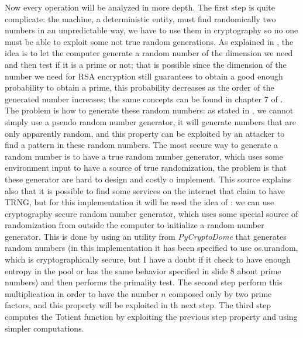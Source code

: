 \documentclass{article}
\begin{document}
Now every operation will be analyzed in more depth.\newline
The first step is quite complicate: the machine, a deterministic entity, must find randomically two numbers in an unpredictable way, we have to use them in cryptography so no one must be able to exploit some not true random generations. As explained in \cite{primeNum}, the idea is to let the computer generate a random number of the dimension we need and then test if it is a prime or not; that is possible since the dimension of the number we need for RSA encryption still guarantees to obtain a good enough probability to obtain a prime, this probability decreases as the order of the generated number increases; the same concepts can be found in chapter 7 of \cite{10.5555/1721909}. The problem is how to generate these random numbers: as stated in \cite{TRNG}, we cannot simply use a pseudo random number generator, it will generate numbers that are only apparently random, and this property can be exploited by an attacker to find a pattern in these random numbers. The most secure way to generate a random number is to have a true random number generator, which uses some environment input to have a source of true randomization, the problem is that these generator are hard to design and costly o implement. This source \cite{TRNG} explains also that it is possible to find some services on the internet that claim to have TRNG, but for this implementation it will be used the idea of \cite{pyrandom}: we can use cryptography secure random number generator, which uses some special source of randomization from outside the computer to initialize a random number generator. This is done by using an utility from \textit{PyCryptoDome} that generates random numbers (in this implementation it has been specified to use os.urandom, which is cryptographically secure, but I have a doubt if it check to have enough entropy in the pool or has the same behavior specified in slide 8 about prime numbers) and then performs the primality test. \newline
The second step perform this multiplication in order to have the number $n$ composed only by two prime factors, and this property will be exploited in th next step. \newline
The third step computes the Totient function by exploiting the previous step property and using simpler computations. \newline
\end{document}
